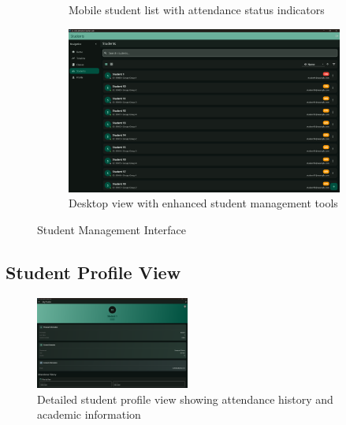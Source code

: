 \begin{figure}[H]
\begin{subfigure}[b]{0.35\textwidth}
        \caption{Mobile student list with attendance status indicators}
    \end{subfigure}
    \hfill
    \begin{subfigure}[b]{0.35\textwidth}
        \includegraphics[width=\textwidth]{images/rachid/teacher-side-studentpage-desktop.png}
        \caption{Desktop view with enhanced student management tools}
    \end{subfigure}
    \caption{Student Management Interface}
    \label{fig:student-management}
\end{figure}

\subsection{Student Profile View}\nopagebreak[4]
\vspace{0.5cm}
\begin{figure}[H]
    \centering
    \includegraphics[width=0.45\textwidth]{images/rachid/teacher-side-studentpage-profileOfStudent-desktop.png}
    \caption{Detailed student profile view showing attendance history and academic information}
    \label{fig:student-profile}
\end{figure}

